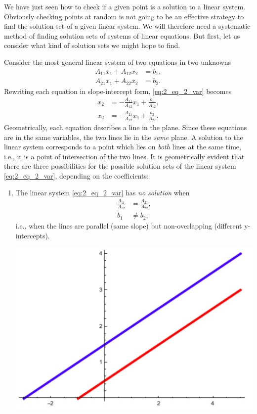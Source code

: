 \documentclass[12pt,letterpaper,reqno]{article}
\numberwithin{equation}{section}
\begin{document}
We have just seen how to check if a given point is a solution to a linear system. Obviously checking points at random is not going to be an effective strategy to find the solution set of a given linear system. We will therefore need a systematic method of finding solution sets of systems of linear equations. But first, let us consider what kind of solution sets we might hope to find.

\begin{example}\label{ex:two_linear_equations_in_two_unknowns}
Consider the most general linear system of two equations in two unknowns
\begin{equation}\label{eq:2_eq_2_var}
	\begin{split}
				A_{11} x_1+A_{12}x_2&=b_1, \\
		A_{21} x_1+A_{22}x_2&=b_2. 
	\end{split}
\end{equation}	
Rewriting each equation in slope-intercept form, \eqref{eq:2_eq_2_var} becomes
\begin{equation}
	\begin{split}
		x_2&=-\frac{A_{11}}{A_{12}}x_1+\frac{b_1}{A_{12}}, \\
		x_2&=-\frac{A_{21}}{A_{22}}x_1+\frac{b_2}{A_{22}}.
	\end{split}
\end{equation}
Geometrically, each equation describes a line in the plane. Since these equations are in the same variables, the two lines lie in the \emph{same} plane. A solution to the linear system corresponds to a point which lies on \emph{both} lines at the same time, i.e., it is a point of intersection of the two lines. It is geometrically evident that there are three possibilities for the possible solution sets of the linear system \eqref{eq:2_eq_2_var}, depending on the coefficients:
\begin{enumerate}[(1)]
	\item The linear system \eqref{eq:2_eq_2_var} has \emph{no solution} when 
	\begin{align*}
		\frac{A_{11}}{A_{12}}&=\frac{A_{21}}{A_{22}}, \\
		b_1 & \neq b_2,
	\end{align*}
i.e., when the lines are parallel (same slope) but non-overlapping (different y-intercepts).
\begin{center}
\includegraphics[scale=0.5]{figures_mvc/two_lines_no_soln}

\end{center}
\end{enumerate}
\end{example}
\end{document}

